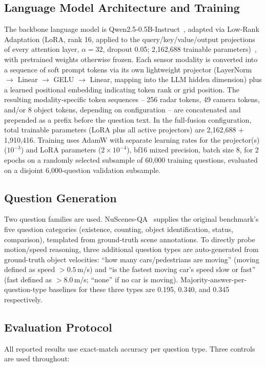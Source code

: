 \documentclass[conference]{IEEEtran}
\begin{document}
\subsection{Language Model Architecture and Training}
The backbone language model is Qwen2.5-0.5B-Instruct~\cite{yang2024qwen25}, adapted via Low-Rank Adaptation
(LoRA, rank 16, applied to the query/key/value/output projections of every attention layer, $\alpha=32$, dropout
0.05; 2{,}162{,}688 trainable parameters)~\cite{hu2022lora}, with pretrained weights otherwise frozen. Each sensor
modality is converted into a sequence of soft prompt tokens via its own lightweight projector (LayerNorm
$\to$ Linear $\to$ GELU $\to$ Linear, mapping into the LLM hidden dimension) plus a learned positional embedding
indicating token rank or grid position. The resulting modality-specific token sequences -- 256 radar tokens, 49
camera tokens, and/or 8 object tokens, depending on configuration -- are concatenated and prepended as a prefix
before the question text. In the full-fusion configuration, total trainable parameters (LoRA plus all active
projectors) are 2{,}162{,}688 + 1{,}910{,}416. Training uses AdamW with separate learning rates for the
projector(s) ($10^{-3}$) and LoRA parameters ($2\times10^{-4}$), bf16 mixed precision, batch size 8, for 2 epochs
on a randomly selected subsample of 60{,}000 training questions, evaluated on a disjoint 6{,}000-question
validation subsample.

\subsection{Question Generation}
Two question families are used. NuScenes-QA~\cite{qian2024nuscenesqa} supplies the original benchmark's five
question categories (existence, counting, object identification, status, comparison), templated from
ground-truth scene annotations. To directly probe motion/speed reasoning, three additional question types are
auto-generated from ground-truth object velocities: ``how many cars/pedestrians are moving'' (moving defined as
speed $>0.5$\,m/s) and ``is the fastest moving car's speed slow or fast'' (fast defined as $>8.0$\,m/s; ``none''
if no car is moving). Majority-answer-per-question-type baselines for these three types are 0.195, 0.340, and
0.345 respectively.

\subsection{Evaluation Protocol}
All reported results use exact-match accuracy per question type. Three controls are used throughout:
\end{document}
